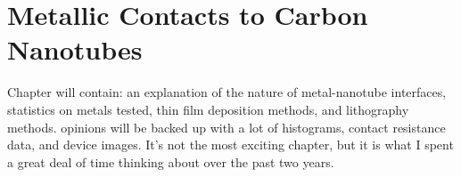 \chapter{Metallic Contacts to Carbon Nanotubes}
\label{sec:contacts}

Chapter will contain: an explanation of the nature of metal-nanotube interfaces, statistics on metals tested, thin film deposition methods, and lithography methods. opinions will be backed up with a lot of histograms, contact resistance data, and device images. It's not the most exciting chapter, but it is what I spent a great deal of time thinking about over the past two years.